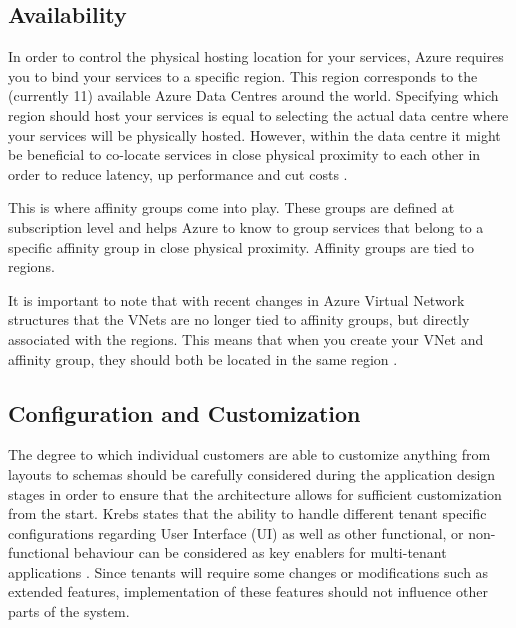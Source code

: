 \subsection{Availability}
\label{sec:availability}
In order to control the physical hosting location for your services, Azure requires you to bind your services to a specific region. This region corresponds to the (currently 11) available Azure Data Centres around the world\cite{Microsoft_Corporation2014-bf}. Specifying which region should host your services is equal to selecting the actual data centre where your services will be physically hosted. However, within the data centre it might be beneficial to co-locate services in close physical proximity to each other in order to reduce latency, up performance and cut costs \cite{Microsoft_Corporation2014-dn}.
 

This is where affinity groups come into play. These groups are defined at subscription level and helps Azure to know to group services that belong to a specific affinity group in close physical proximity. Affinity groups are tied to regions.
 
It is important to note that with recent changes in Azure Virtual Network structures that the VNets are no longer tied to affinity groups, but directly associated with the regions. This means that when you create your VNet and affinity group, they should both be located in the same region \cite{Microsoft_Corporation2014-dn}.

\subsection{Configuration and Customization}
\label{sec:custandconf}

The degree to which individual customers are able to customize anything from layouts to schemas should be carefully considered during the application design stages in order to ensure that the architecture allows for sufficient customization from the start. Krebs states that the ability to handle different tenant specific configurations regarding User Interface (UI) as well as other functional, or non-functional behaviour can be considered as key enablers for multi-tenant applications \cite{Krebs2012}. Since tenants will require some changes or modifications such as extended features, implementation of these features should not influence other parts of the system.
 
